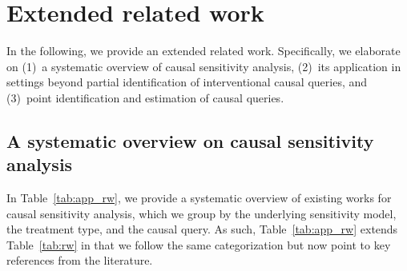 \documentclass{article} %
\newcommand{\frameworkname}{\textsc{NeuralCSA}\xspace}
\theoremstyle{definition}
\theoremstyle{plain}
\begin{document}



\clearpage




\clearpage

\appendix
\section{Extended related work}\label{app:rw}

In the following, we provide an extended related work. Specifically, we elaborate on (1)~a systematic overview of causal sensitivity analysis, (2)~its application in settings beyond partial identification of interventional causal queries, and (3)~point identification and estimation of causal queries.

\subsection{A systematic overview on causal sensitivity analysis}

In Table~\ref{tab:app_rw}, we provide a systematic overview of existing works for causal sensitivity analysis, which we group by the underlying sensitivity model, the treatment type, and the causal query. As such, Table~\ref{tab:app_rw} extends Table~\ref{tab:rw} in that we follow the same categorization but now point to key references from the literature.
\end{document}
